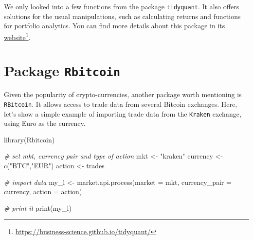 \documentclass[
  12pt,
]{book}
\newenvironment{Shaded}{\begin{snugshade}}{\end{snugshade}}
\newcommand{\AttributeTok}[1]{\textcolor[rgb]{0.61,0.61,0.61}{#1}}
\newcommand{\CommentTok}[1]{\textcolor[rgb]{0.37,0.37,0.37}{\textit{#1}}}
\newcommand{\FunctionTok}[1]{\textcolor[rgb]{0,0,0}{#1}}
\newcommand{\NormalTok}[1]{#1}
\newcommand{\OtherTok}[1]{\textcolor[rgb]{0.37,0.37,0.37}{#1}}
\newcommand{\StringTok}[1]{\textcolor[rgb]{0.5,0.5,0.5}{#1}}
\begin{document}
We only looked into a few functions from the package \texttt{tidyquant}. It also offers solutions for the usual manipulations, such as calculating returns and functions for portfolio analytics. You can find more details about this package in its \href{https://business-science.github.io/tidyquant/}{website}\footnote{\url{https://business-science.github.io/tidyquant/}}.

\hypertarget{package-rbitcoin}{%
\section{\texorpdfstring{Package \texttt{Rbitcoin}}{Package Rbitcoin}}\label{package-rbitcoin}}

Given the popularity of crypto-currencies, another package worth mentioning is \texttt{RBitcoin}. It allows access to trade data from several Bitcoin exchanges. Here, let's show a simple example of importing trade data from the \texttt{\textquotesingle{}Kraken\textquotesingle{}} exchange, using Euro as the currency.

\begin{Shaded}
\begin{Highlighting}[]
\FunctionTok{library}\NormalTok{(Rbitcoin)}

\CommentTok{\# set mkt, currency pair and type of action}
\NormalTok{mkt }\OtherTok{\textless{}{-}} \StringTok{"kraken"}
\NormalTok{currency }\OtherTok{\textless{}{-}} \FunctionTok{c}\NormalTok{(}\StringTok{"BTC"}\NormalTok{,}\StringTok{"EUR"}\NormalTok{)}
\NormalTok{action }\OtherTok{\textless{}{-}} \StringTok{\textquotesingle{}trades\textquotesingle{}}

\CommentTok{\# import data}
\NormalTok{my\_l }\OtherTok{\textless{}{-}} \FunctionTok{market.api.process}\NormalTok{(}\AttributeTok{market =}\NormalTok{ mkt,}
                           \AttributeTok{currency\_pair =}\NormalTok{ currency,}
                           \AttributeTok{action =}\NormalTok{ action)}

\CommentTok{\# print it}
\FunctionTok{print}\NormalTok{(my\_l)}
\end{Highlighting}
\end{Shaded}
\end{document}
